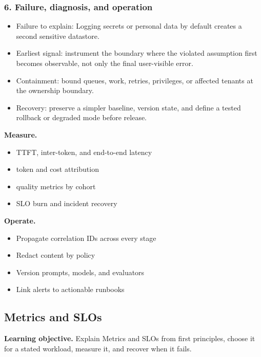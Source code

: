 \subsubsection*{6. Failure, diagnosis, and operation}
\begin{itemize}
\item Failure to explain: Logging secrets or personal data by default creates a second sensitive datastore.
\item Earliest signal: instrument the boundary where the violated assumption first becomes observable, not only the final user-visible error.
\item Containment: bound queues, work, retries, privileges, or affected tenants at the ownership boundary.
\item Recovery: preserve a simpler baseline, version state, and define a tested rollback or degraded mode before release.
\end{itemize}
\textbf{Measure.}\begin{itemize}
\item TTFT, inter-token, and end-to-end latency
\item token and cost attribution
\item quality metrics by cohort
\item SLO burn and incident recovery
\end{itemize}
\textbf{Operate.}\begin{itemize}
\item Propagate correlation IDs across every stage
\item Redact content by policy
\item Version prompts, models, and evaluators
\item Link alerts to actionable runbooks
\end{itemize}
\subsection{Metrics and SLOs}
\textbf{Learning objective.} Explain Metrics and SLOs from first principles, choose it for a stated workload, measure it, and recover when it fails.
